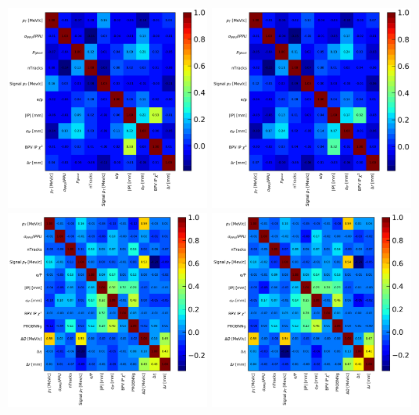 \begin{figure}[htbp]
        \begin{center}
        \includegraphics[width=0.47\textwidth]{04Flavourtagging/figs/OSelectronOpt/2017-12-12-vibattis-OSElectron-bdt-calibration-sWeights_Run1/FeaturesCorrRightTag_RunIcuts.pdf}
        \includegraphics[width=0.47\textwidth]{04Flavourtagging/figs/OSelectronOpt/2017-12-12-vibattis-OSElectron-bdt-calibration-sWeights_Run1/FeaturesCorrWrongTag_RunIcuts.pdf} \\
        \includegraphics[width=0.47\textwidth]{04Flavourtagging/figs/OSelectronOpt/2017-12-12-vibattis-OSElectron-bdt-calibration-sWeights_Run2/FeaturesCorrRightTag_RunIIcuts.pdf}
        \includegraphics[width=0.47\textwidth]{04Flavourtagging/figs/OSelectronOpt/2017-12-12-vibattis-OSElectron-bdt-calibration-sWeights_Run2/FeaturesCorrWrongTag_RunIIcuts.pdf} \\

\end{center}
\end{figure}
